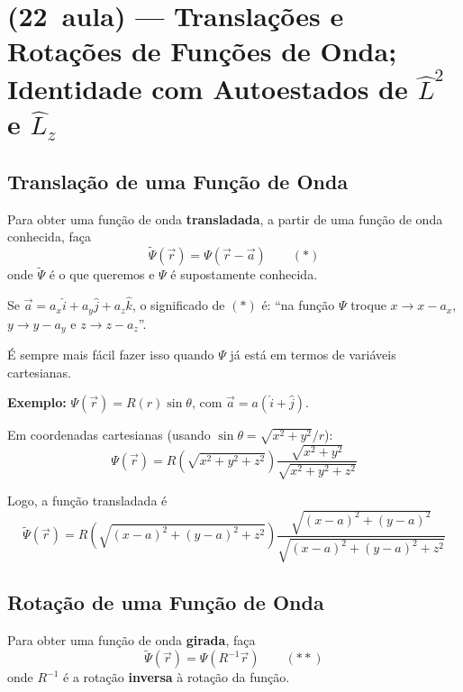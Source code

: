 \section*{(22\textordfeminine\ aula) --- Translações e Rotações de Funções de Onda; Identidade com Autoestados de $\hat{L}^2$ e $\hat{L}_z$}

\subsection*{Translação de uma Função de Onda}

Para obter uma função de onda \textbf{transladada}, a partir de uma função de onda conhecida, faça
\begin{equation}
    \widetilde{\Psi}(\vec{r}) = \Psi(\vec{r} - \vec{a}) \qquad (*)
\label{eq:aula22_translacao_def}
\end{equation}
onde $\widetilde{\Psi}$ é o que queremos e $\Psi$ é supostamente conhecida.

Se $\vec{a} = a_x\hat{i} + a_y\hat{j} + a_z\hat{k}$, o significado de $(*)$ é: ``na função $\Psi$ troque $x \to x - a_x$, $y \to y - a_y$ e $z \to z - a_z$''.

É sempre mais fácil fazer isso quando $\Psi$ já está em termos de variáveis cartesianas.

\textbf{Exemplo:} $\Psi(\vec{r}) = R(r)\sin\theta$, com $\vec{a} = a(\hat{i} + \hat{j})$.

Em coordenadas cartesianas (usando $\sin\theta = \sqrt{x^2+y^2}/r$):
\begin{equation}
    \Psi(\vec{r}) = R\left(\sqrt{x^2+y^2+z^2}\right) \frac{\sqrt{x^2+y^2}}{\sqrt{x^2+y^2+z^2}}
\label{eq:aula22_exemplo_trans_cart}
\end{equation}

Logo, a função transladada é
\begin{equation}
    \widetilde{\Psi}(\vec{r}) = R\left(\sqrt{(x-a)^2+(y-a)^2+z^2}\right) \frac{\sqrt{(x-a)^2+(y-a)^2}}{\sqrt{(x-a)^2+(y-a)^2+z^2}}
\label{eq:aula22_exemplo_trans_final}
\end{equation}

\subsection*{Rotação de uma Função de Onda}

Para obter uma função de onda \textbf{girada}, faça
\begin{equation}
    \widetilde{\Psi}(\vec{r}) = \Psi(R^{-1}\vec{r}) \qquad (**)
\label{eq:aula22_rotacao_def}
\end{equation}
onde $R^{-1}$ é a rotação \textbf{inversa} à rotação da função.

